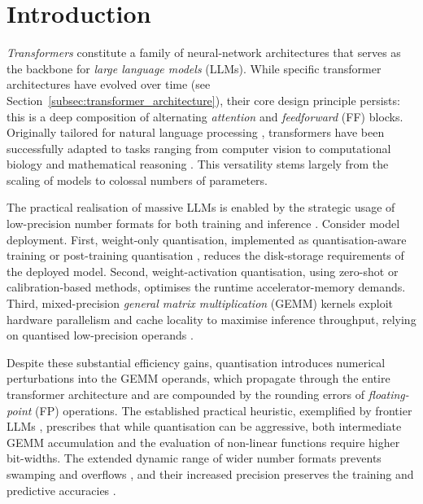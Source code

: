 \documentclass[namedate,webpdf,imanum]{ima-authoring-template}
\numberwithin{equation}{section}
\begin{document}

\maketitle


\section{Introduction}
\emph{Transformers} \citep{vaswani2017attention} constitute a family of neural-network architectures that serves as the backbone for \emph{large language models} (LLMs).
While specific transformer architectures have evolved over time (see Section~\ref{subsec:transformer_architecture}), their core design principle persists: this is a deep composition of alternating \emph{attention} and \emph{feedforward} (FF) blocks.
Originally tailored for natural language processing \citep{devlin2019bert}, transformers have been successfully adapted to tasks ranging from computer vision \citep{dosovitskiy2021image} to computational biology \citep{ying2021transformers, lin2023evolutionary} and mathematical reasoning \citep{frieder2023mathematical}.
This versatility stems largely from the scaling of models to colossal numbers of parameters.

The practical realisation of massive LLMs is enabled by the strategic usage of low-precision number formats for both training and inference \citep{micikevicius2018mixed, nagel2021white}.
Consider model deployment.
First, weight-only quantisation, implemented as quantisation-aware training \citep{jacob2018quantization} or post-training quantisation \citep{frantar2023gptq, lin2024awq}, reduces the disk-storage requirements of the deployed model.
Second, weight-activation quantisation, using zero-shot \citep{dettmers2022gpt3, rouhani2023microscaling} or calibration-based \citep{xiao2023smoothquant} methods, optimises the runtime accelerator-memory demands.
Third, mixed-precision \emph{general matrix multiplication} (GEMM) kernels exploit hardware parallelism and cache locality to maximise inference throughput, relying on quantised low-precision operands \citep{sze2017efficient, markidis2018nvidia}.

Despite these substantial efficiency gains, quantisation introduces numerical perturbations into the GEMM operands, which propagate through the entire transformer architecture and are compounded by the rounding errors of \emph{floating-point} (FP) operations.
The established practical heuristic, exemplified by frontier LLMs \citep{liu2024deepseek}, prescribes that while quantisation can be aggressive, both intermediate GEMM accumulation and the evaluation of non-linear functions require higher bit-widths.
The extended dynamic range of wider number formats prevents swamping and overflows \citep{micikevicius2018mixed, colbert2024accumulator}, and their increased precision preserves the training and predictive accuracies \citep{kim2021bert, shah2024flashattention, qi2025defeating}.
\end{document}
